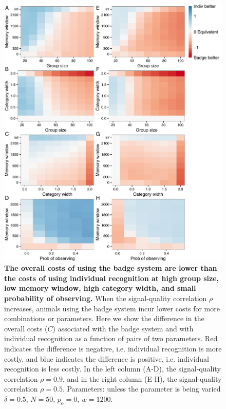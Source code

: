 \begin{figure}
\includegraphics[width=6.85in]{figures/cost_comparisons.pdf}
\caption{\sffamily\small\textbf{The overall costs of using the badge system are lower than the costs of using individual recognition at high group size, low memory window, high category width, and small probability of observing.} When the signal-quality correlation $\rho$ increases, animals using the badge system incur lower costs for more combinations or parameters. Here we show the difference in the overall costs ($C$) associated with the badge system and with individual recognition as a function of pairs of two parameters. Red indicates the difference is negative, i.e. individual recognition is more costly, and blue indicates the difference is positive, i.e. individual recognition is less costly.  In the left column (A-D), the signal-quality correlation $\rho=0.9$, and in the right column (E-H), the signal-quality correlation $\rho=0.5$. Parameters: unless the parameter is being varied $\delta = 0.5$, $N=50$, $p_\text{o}=0$, $w=1200$.}
\label{comparison}
\end{figure}

